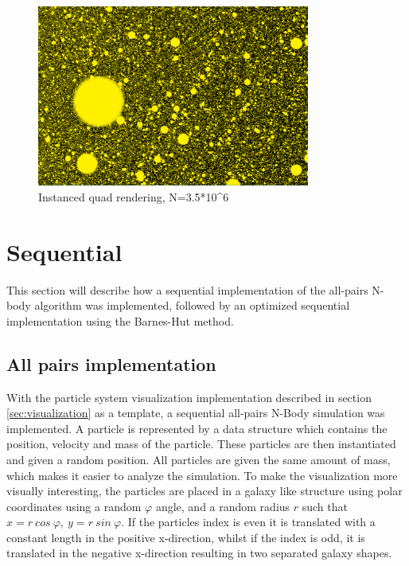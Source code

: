 \begin{figure}[!htpb]
    \centering
    \includegraphics[width=0.8\textwidth]{Method/Figs/OpenGLVis_N=3500000.png}
    \caption{Instanced quad rendering, N=3.5*10^6}
    \label{fig:OpenGLEarlyVis}
\end{figure}


\section{Sequential}

This section will describe how a sequential implementation of the all-pairs N-body algorithm was implemented, followed by an optimized sequential implementation using the Barnes-Hut method. \cite{barnes1986hierarchical}


\subsection{All pairs implementation}
With the particle system visualization implementation described in section \ref{sec:visualization} as a template, a sequential all-pairs N-Body simulation was implemented. A particle is represented by a data structure which contains the position, velocity and mass of the particle. These particles are then instantiated and given a random position. All particles are given the same amount of mass, which makes it easier to analyze the simulation. To make the visualization more visually interesting, the particles are placed in a galaxy like structure using polar coordinates using a random $\varphi$ angle, and a random radius $r$ such that $x = r \ cos \ \varphi, \ y = r \ sin \ \varphi$. If the particles index is even it is translated with a constant length in the positive x-direction, whilst if the index is odd, it is translated in the negative x-direction resulting in two separated galaxy shapes.

